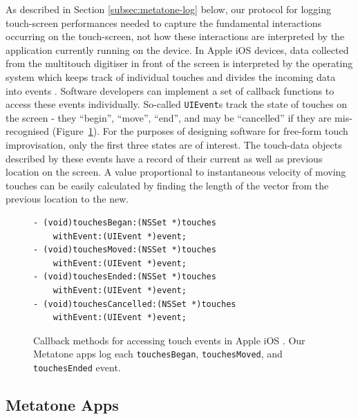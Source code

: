 \documentclass[graybox]{svmult}
\begin{document}
As described in Section \ref{subsec:metatone-log} below, our protocol for
logging touch-screen performances needed to capture the fundamental
interactions occurring on the touch-screen, not how these interactions
are interpreted by the application currently running on the device. In
Apple iOS devices, data collected from the multitouch digitiser in
front of the screen is interpreted by the operating system which keeps
track of individual touches and divides the incoming data into
events \citep{AppleDeveloper:2015rm}. Software developers can implement
a set of callback functions to access these events individually.
So-called \texttt{UIEvent}s track the state of touches on the screen -
they ``begin'', ``move'', ``end'', and may be ``cancelled'' if they
are mis-recognised (Figure~\ref{touch-event-code-listing}). For the purposes of designing software for
free-form touch improvisation, only the first three states are of
interest. The touch-data objects described by these events have a
record of their current as well as previous location on the screen. A
value proportional to instantaneous velocity of moving touches can be
easily calculated by finding the length of the vector from the
previous location to the new.

\begin{figure}
\begin{verbatim}
- (void)touchesBegan:(NSSet *)touches 
    withEvent:(UIEvent *)event;
- (void)touchesMoved:(NSSet *)touches 
    withEvent:(UIEvent *)event;
- (void)touchesEnded:(NSSet *)touches 
    withEvent:(UIEvent *)event;
- (void)touchesCancelled:(NSSet *)touches 
    withEvent:(UIEvent *)event;
\end{verbatim}
  \caption{Callback methods for accessing touch events in Apple
    iOS \citep{AppleDeveloper:2015rm}. Our Metatone apps log each
    \texttt{touchesBegan}, \texttt{touchesMoved}, and
    \texttt{touchesEnded} event.\label{touch-event-code-listing}}
\end{figure}

\subsection{Metatone Apps}
\label{subsec:metatone-apps}
\end{document}
